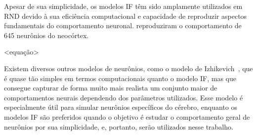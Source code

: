 Apesar de sua simplicidade, os modelos IF têm sido amplamente utilizados em RND devido à sua eficiência computacional e capacidade
de reproduzir aspectos fundamentais do comportamento neuronal. \cite{teeterGeneralized2018} reproduziram o comportamento de 645
neurônios do neocórtex. %


<equação>

Existem diversos outros modelos de neurônios, como o modelo de Izhikevich~\cite{izhikevichSimple2003}, que é quase tão simples em
termos computacionais quanto o modelo IF, mas que consegue capturar de forma muito mais realista um conjunto maior de
comportamentos neurais dependendo dos parâmetros utilizados. Esse modelo é especialmente útil para simular neurônios específicos
do cérebro, enquanto os modelos IF são preferidos quando o objetivo é estudar o comportamento geral de neurônios por sua
simplicidade, e, portanto, serão utilizados nesse trabalho.

